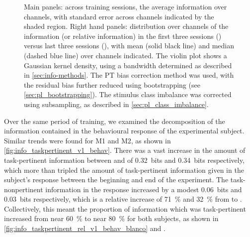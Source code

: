 \begin{figure}[htbp]
{Main panels: across training sessions, the average information over channels, with standard error across channels indicated by the shaded region.
Right hand panels: distribution over channels of the information (or relative information) in the first three sessions () versus last three sessions (), with mean (solid black line) and median (dashed blue line) over channels indicated.
The violin plot shows a Gaussian kernel density, using a bandwidth determined as described in \autoref{sec:info-methods}.
The \ac{PT} bias correction method was used, with the residual bias further reduced using bootstrapping (see \autoref{sec:pl_bootstrapping}).
The stimulus class imbalance was corrected using subsampling, as described in \autoref{sec:pl_class_imbalance}.
    \label{fig:info_taskpertinent_v1_ch}
}
\end{figure}


Over the same period of training, we examined the decomposition of the information contained in the behavioural response of the experimental subject.
Similar trends were found for \ac{M1} and \ac{M2}, as shown in \autoref{fig:info_taskpertinent_v1_behav}.
There was a vast increase in the amount of task-pertinent information between  and  of \SI{+0.32}{bits} and \SI{+0.34}{bits} respectively, which more than tripled the amount of task-pertinent information given in the subject's response between the beginning and end of the experiment.
The task-nonpertinent information in the response increased by a modest \SI{+0.06}{bits} and \SI{+0.03}{bits} respectively, which is a relative increase of \SI{71}{\percent} and \SI{32}{\percent} from  to .
Collectively, this meant the proportion of information which was task-pertinent increased from near \SI{60}{\percent} to near \SI{80}{\percent} for both subjects, as shown in \autoref{fig:info_taskpertinent_rel_v1_behav_blanco} and .

%

